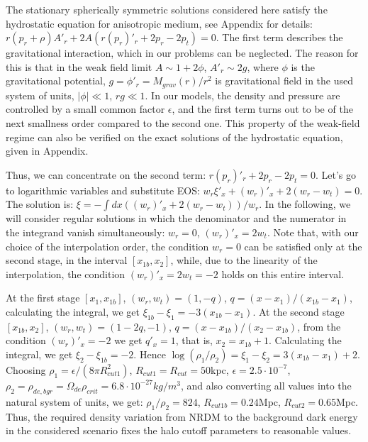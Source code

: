 \documentclass{article}
\begin{document}
The stationary spherically symmetric solutions considered here satisfy the hydrostatic equation for anisotropic medium, see Appendix for details: $ r (p_r + \rho) A'_r + 2A (r (p_r) '_ r + 2p_r-2p_t) = 0 $. The first term describes the gravitational interaction, which in our problems can be neglected. The reason for this is that in the weak field limit $ A \sim1 + 2 \phi $, $ A'_r \sim2g $, where $ \phi $ is the gravitational potential, $ g = \phi'_r = M_ {grav } (r) / r ^ 2 $ is gravitational field in the used system of units, $ | \phi | \ll1 $, $ rg \ll1 $. In our models, the density and pressure are controlled by a small common factor $ \epsilon $, and the first term turns out to be of the next smallness order compared to the second one. This property of the weak-field regime can also be verified on the exact solutions of the hydrostatic equation, given in Appendix.

Thus, we can concentrate on the second term: $ r (p_r) '_ r + 2p_r-2p_t = 0 $. Let's go to logarithmic variables and substitute EOS: $ w_r \xi'_x + (w_r) '_ x + 2 (w_r-w_t) = 0 $. The solution is: $ \xi = - \int dx ((w_r) '_ x + 2 (w_r-w_t)) / w_r $. In the following, we will consider regular solutions in which the denominator and the numerator in the integrand vanish simultaneously: $ w_r = 0 $, $ (w_r) '_ x = 2w_t $. Note that, with our choice of the interpolation order, the condition $ w_r = 0 $ can be satisfied only at the second stage, in the interval $ [x_ {1b}, x_2] $, while, due to the linearity of the interpolation, the condition $ (w_r) '_ x = 2w_t = -2 $ holds on this entire interval.

At the first stage $ [x_1, x_ {1b}] $, $ (w_r, w_t) = (1, -q) $, $ q = (x-x_1) / (x_ {1b} -x_1) $, calculating the integral, we get $ \xi_ {1b} - \xi_1 = -3 (x_ {1b} -x_1) $. At the second stage $ [x_ {1b}, x_ {2}] $, $ (w_r, w_t) = (1-2q, -1) $, $ q = (x-x_ {1b}) / (x_2-x_ {1b}) $, from the condition $ (w_r) '_ x = -2 $ we get $ q'_x = 1 $, that is, $ x_2 = x_ {1b} + 1 $. Calculating the integral, we get $ \xi_2- \xi_ {1b} = - 2 $. Hence $ \log (\rho_1 / \rho_2) = \xi_1- \xi_2 = 3 (x_ {1b} -x_1) + 2 $. Choosing $ \rho_1 = \epsilon / (8 \pi R_ {cut1} ^ 2) $, $ R_ {cut1} = R_ {cut} = 50 $kpc, $ \epsilon = 2.5 \cdot10 ^ {- 7} $, $ \rho_2 = \rho_ {de, bgr} = \Omega_ {de} \rho_ {crit} = 6.8 \cdot10 ^ {- 27} kg / m ^ 3 $, and also converting all values into the natural system of units, we get: $ \rho_1 / \rho_2 = 824 $, $ R_ {cut1b} = 0.24 $Mpc, $ R_ {cut2} = 0.65 $Mpc. Thus, the required density variation from NRDM to the background dark energy in the considered scenario fixes the halo cutoff parameters to reasonable values.
\end{document}
